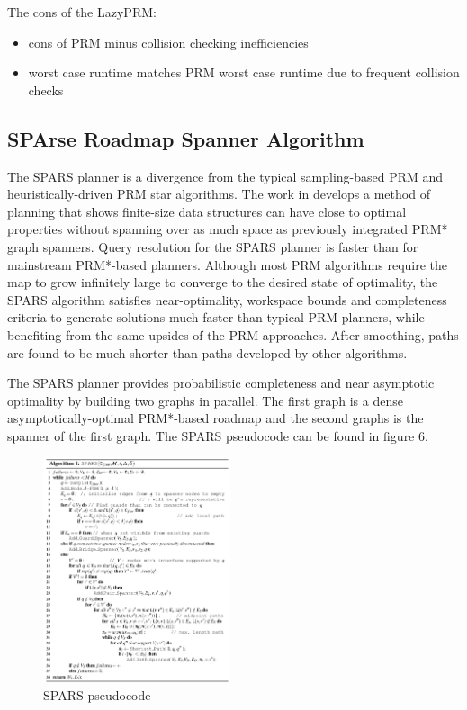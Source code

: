 \documentclass[conference]{IEEEtran} \usepackage[T1]{fontenc} \usepackage[backend=biber, style=ieee]{biblatex}
\begin{document}
The cons of the LazyPRM:
\begin{itemize}
\item cons of PRM minus collision checking inefficiencies
\item worst case runtime matches PRM worst case runtime due to frequent collision checks
\end{itemize}

\subsection{SPArse Roadmap Spanner Algorithm} \label{SPARS}
The SPARS planner is a divergence from the typical sampling-based PRM and heuristically-driven PRM star algorithms. The work in \cite{spars} develops a method of planning 
that shows finite-size data structures can have close to optimal properties without spanning over as much space as previously integrated PRM* graph spanners. Query
resolution for the SPARS planner is faster than for mainstream PRM*-based planners. Although most PRM algorithms require the map to grow infinitely large to converge to 
the desired state of optimality, the SPARS algorithm satisfies near-optimality, workspace bounds and completeness criteria to generate solutions much faster than typical
PRM planners, while benefiting from the same upsides of the PRM approaches. After smoothing, paths are found to be much shorter than paths developed by other algorithms.

The SPARS planner provides probabilistic completeness and near asymptotic optimality by building two graphs in parallel. The first graph is a dense asymptotically-optimal
PRM*-based roadmap and the second graphs is the spanner of the first graph. The SPARS pseudocode can be found in figure 6.

\begin{figure}
\label{figure6} 
\centering 
\includegraphics[width=0.49\textwidth]{spars}
\caption{SPARS pseudocode}
\end{figure}
\end{document}

